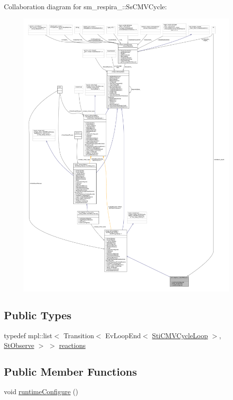 Collaboration diagram for sm\+\_\+respira\+\_\+:\+:Ss\+C\+M\+V\+Cycle\+:
\nopagebreak
\begin{figure}[H]
\begin{center}
\leavevmode
\includegraphics[width=350pt]{structsm__respira__1_1_1SsCMVCycle__coll__graph}
\end{center}
\end{figure}
\subsection*{Public Types}
\begin{DoxyCompactItemize}
\item 
typedef mpl\+::list$<$ Transition$<$ Ev\+Loop\+End$<$ \hyperlink{structsm__respira__1_1_1cmv__cycle__inner__states_1_1StiCMVCycleLoop}{Sti\+C\+M\+V\+Cycle\+Loop} $>$, \hyperlink{structsm__respira__1_1_1StObserve}{St\+Observe} $>$ $>$ \hyperlink{structsm__respira__1_1_1SsCMVCycle_ae7a341d2159261c69bcb6bda3ac6a71e}{reactions}
\end{DoxyCompactItemize}
\subsection*{Public Member Functions}
\begin{DoxyCompactItemize}
\item 
void \hyperlink{structsm__respira__1_1_1SsCMVCycle_a8cf930dea0543149d8571982afa81533}{runtime\+Configure} ()
\end{DoxyCompactItemize}
